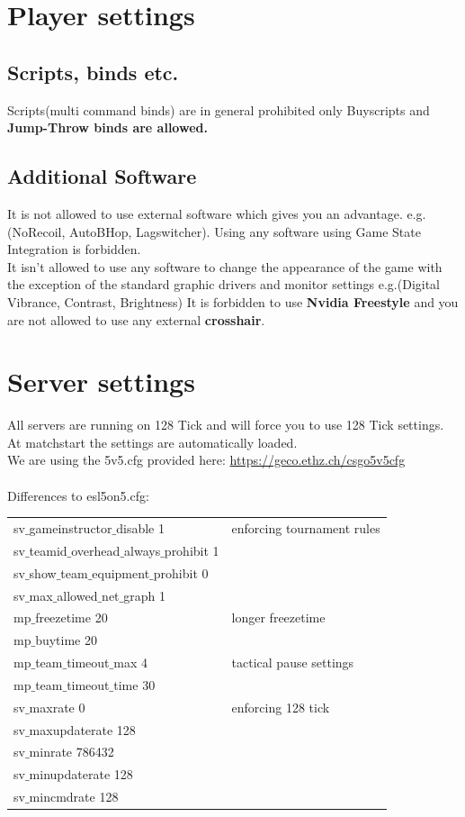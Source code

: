 \documentclass{article}
\begin{document}
\section{Player settings}
\subsection{Scripts, binds etc.}
Scripts(multi command binds) are in general prohibited only Buyscripts and \textbf{Jump-Throw binds are allowed.}

\subsection{Additional Software}
It is not allowed to use external software which gives you an advantage. e.g.(NoRecoil, AutoBHop, Lagswitcher). Using any software using Game State Integration is forbidden.\\
It isn't allowed to use any software to change the appearance of the game with the exception of the standard graphic drivers and monitor settings e.g.(Digital Vibrance, Contrast, Brightness)
It is forbidden to use \textbf{Nvidia Freestyle} and you are not allowed to use any external \textbf{crosshair}.


\section{Server settings}
All servers are running on 128 Tick and will force you to use 128 Tick settings.\\
At matchstart the settings are automatically loaded.\\
We are using the 5v5.cfg provided here:
\url{https://geco.ethz.ch/csgo5v5cfg} \\\\
Differences to esl5on5.cfg:\\
\begin{tabular}{ | l | l | }
	\hline			
	sv$\_$gameinstructor$\_$disable 1 & enforcing tournament rules\\
	sv$\_$teamid$\_$overhead$\_$always$\_$prohibit 1 & \\
	sv$\_$show$\_$team$\_$equipment$\_$prohibit 0 & \\
	sv$\_$max$\_$allowed$\_$net$\_$graph 1 &  \\
	\hline
	mp$\_$freezetime 20 & longer freezetime\\
	mp$\_$buytime 20 & \\
	\hline
	mp$\_$team$\_$timeout$\_$max 4 & tactical pause settings\\
	mp$\_$team$\_$timeout$\_$time 30 & \\
	\hline
	sv$\_$maxrate 0 & enforcing 128 tick \\
	sv$\_$maxupdaterate 128 & \\
	sv$\_$minrate 786432 & \\
	sv$\_$minupdaterate 128 & \\
	sv$\_$mincmdrate 128 & \\
	\hline  
\end{tabular}
\end{document}
